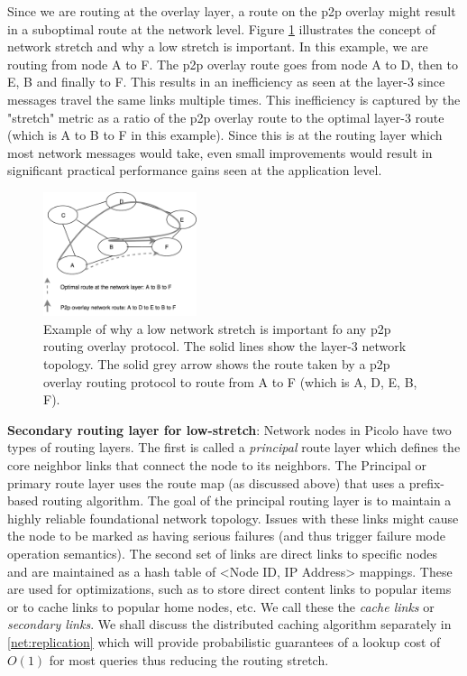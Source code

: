 Since we are routing at the overlay layer, a route on the p2p overlay might result in a suboptimal route at the network
level. Figure \ref{fig:network-stretch} illustrates the concept of network stretch and why a low stretch is important. In this
example, we are routing from node A to F. The p2p overlay route goes from node A to D, then to E, B and finally to F.
This results in an inefficiency as seen at the layer-3 since messages travel the same links multiple times. This
inefficiency is captured by the "stretch" metric as a ratio of the p2p overlay route to the optimal layer-3 route (which
is A to B to F in this example). Since this is at the routing layer which most network messages would take, even small
improvements would result in significant practical performance gains seen at the application level.

\begin{figure}[t]
    \centering
    \includegraphics[width=0.40\textwidth]{fig/network-stretch.png}
  \caption{Example of why a low network stretch is important fo any p2p routing overlay protocol. The solid lines show
    the layer-3 network topology. The solid grey arrow shows the route taken by a p2p overlay routing protocol to route
    from A to F (which is A, D, E, B, F).}
    \label{fig:network-stretch}
\end{figure}

\textbf{\newline Secondary routing layer for low-stretch}: Network nodes in \textsf{Picolo} have two types of routing layers. The first is
called a {\em principal} route layer which defines the core neighbor links that connect the node to its neighbors. The
Principal or primary route layer uses the route map (as discussed above) that uses a prefix-based routing algorithm. The
goal of the principal routing layer is to maintain a highly reliable foundational network topology. Issues with these
links might cause the node to be marked as having serious failures (and thus trigger failure mode operation semantics).
The second set of links are direct links to specific nodes and are maintained as a hash table of \textsf{<Node ID, IP Address>}
mappings. These are used for optimizations, such as to store direct content links to popular items or to cache links to popular home
nodes, etc. We call these the {\em cache links} or {\em secondary links}. We shall discuss the distributed caching
algorithm separately in \cref{net:replication} which will provide probabilistic guarantees of a lookup cost of
\(O(1)\) for most queries thus reducing the routing stretch.

